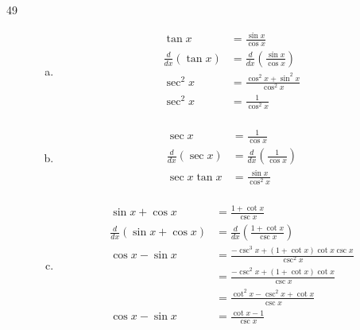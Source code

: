 \documentclass[letterpaper, landscape]{exam}
\begin{document}
\begin{description}
    \item[49]
      \begin{enumerate}[(a)]
        \item 
          \begin{align*}
            \tan x                  & = \frac{\sin x}{\cos x} \\
            \frac{d}{dx} ( \tan x ) & = \frac{d}{dx} \left( \frac{\sin x}{\cos x} \right) \\
            \sec^2 x                & =  \frac{\cos^2 x + \sin^2 x}{\cos^2 x} \\
            \sec^2 x                & =  \frac{1}{\cos^2 x} \\
          \end{align*}

        \item
          \begin{align*}
            \sec x                  & = \frac{1}{\cos x} \\
            \frac{d}{dx} ( \sec x ) & = \frac{d}{dx} \left( \frac{1}{\cos x} \right) \\
            \sec x \tan x           & = \frac{\sin x}{\cos^2 x} \\
          \end{align*}

        \item
          \begin{align*}
            \sin x + \cos x                  & = \frac{1 + \cot x }{\csc x} \\
            \frac{d}{dx} ( \sin x + \cos x ) & = \frac{d}{dx} \left( \frac{1 + \cot x }{\csc x}  \right) \\
            \cos x - \sin x                  & = \frac{ - \csc^3 x + (1 + \cot x) \cot x \csc x }{\csc^2 x} \\
                                             & = \frac{ - \csc^2 x + (1 + \cot x) \cot x }{\csc x} \\
                                             & = \frac{ \cot^2 x - \csc^2 x + \cot x }{\csc x} \\
            \cos x - \sin x                  & = \frac{ \cot x - 1 }{\csc x} \\
          \end{align*}
      \end{enumerate}

  \end{description}
\end{document}
